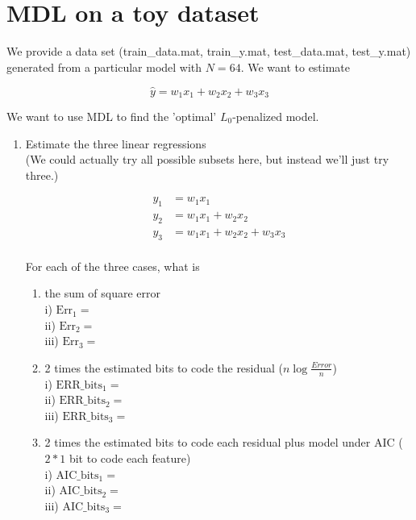 \section{ MDL on a toy dataset}

We provide a data set (train\_data.mat, train\_y.mat, test\_data.mat, test\_y.mat) generated from a particular model with $N=64$. We want to estimate

\begin{equation*}
 \hat{y} =  w_1 x_1 + w_2 x_2 + w_3 x_3 
\end{equation*}

We want to use MDL to find the 'optimal' $L_0$-penalized model.

\begin{enumerate}
\item  Estimate the three linear regressions \\

(We could actually try all possible subsets here, but instead we'll just try three.)

\begin{align*}
  y_1& = w_1 x_1 \\
  y_2& = w_1 x_1 + w_2 x_2 \\
  y_3& = w_1 x_1 + w_2 x_2 + w_3 x_3  \\
\end{align*}

For each of the three cases, what is
\begin{enumerate}
\item the sum of square error \\
i)   $\text{Err}_1 = $ \\
ii)  $\text{Err}_2 = $\\
iii) $\text{Err}_3 = $\\


\item 2 times the estimated bits to code the residual ($n \log{\frac{Error}{n}} $)  \\
i)    $\text{ERR}\_\text{bits}_1 = $ \\
ii)   $\text{ERR}\_\text{bits}_2 = $ \\
iii)  $\text{ERR}\_\text{bits}_3 = $ \\


\item 2 times the estimated bits to code each residual plus model under AIC ($2*1$ bit to code each feature) \\
i)    $\text{AIC}\_\text{bits}_1 = $ \\
ii)   $\text{AIC}\_\text{bits}_2 = $ \\
iii)  $\text{AIC}\_\text{bits}_3 = $ \\



\end{enumerate}
\end{enumerate}
